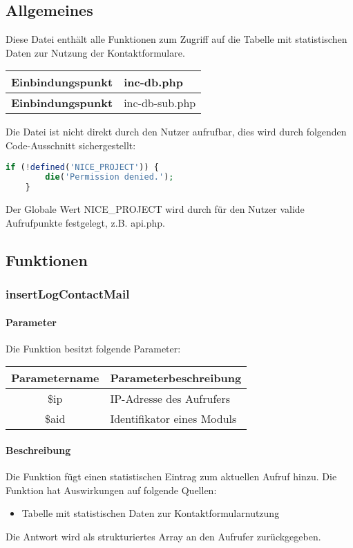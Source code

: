 \subsection{Allgemeines} Diese Datei enthält alle Funktionen zum Zugriff auf die Tabelle mit statistischen Daten zur Nutzung der Kontaktformulare.
\begin{table}[H]
	\begin{tabular}{|c|p{11cm}|}
		\hline
		\textbf{Einbindungspunkt} & inc-db.php \\ \hline
		\textbf{Einbindungspunkt} & inc-db-sub.php \\ \hline
	\end{tabular}
\end{table}
Die Datei ist nicht direkt durch den Nutzer aufrufbar, dies wird durch folgenden Code-Ausschnitt sichergestellt:
\begin{lstlisting}[language=php]
	if (!defined('NICE_PROJECT')) {
		die('Permission denied.');
	}
\end{lstlisting}
Der Globale Wert {\glqq NICE\_PROJECT\grqq} wird durch für den Nutzer valide Aufrufpunkte festgelegt, z.B. {\glqq api.php\grqq}.
\subsection{Funktionen}
\subsubsection{insertLogContactMail}
\paragraph{Parameter} Die Funktion besitzt folgende Parameter:
\begin{table}[H]
	\begin{tabular}{|c|p{11cm}|}
		\hline
		\textbf{Parametername} & \textbf{Parameterbeschreibung} \\ \hline
		\$ip   & IP-Adresse des Aufrufers \\ \hline
		\$aid  & Identifikator eines Moduls \\ \hline
	\end{tabular}
\end{table}
\paragraph{Beschreibung} Die Funktion fügt einen statistischen Eintrag zum aktuellen Aufruf hinzu. Die Funktion hat Auswirkungen auf folgende Quellen:
\begin{itemize}
	\item Tabelle mit statistischen Daten zur Kontaktformularnutzung
\end{itemize}
Die Antwort wird als strukturiertes Array an den Aufrufer zurückgegeben.
